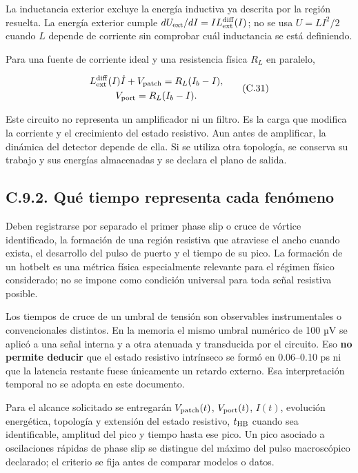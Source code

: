 \documentclass[
  spanish,
  10pt,
  a4paper,
]{article}
\begin{document}
La inductancia exterior excluye la energía inductiva ya descrita por la
región resuelta. La energía exterior cumple
\(dU_{\rm ext}/dI=I L_{\rm ext}^{\rm diff}(I)\); no se usa \(U=LI^2/2\)
cuando \(L\) depende de corriente sin comprobar cuál inductancia se está
definiendo.

Para una fuente de corriente ideal y una resistencia física \(R_L\) en
paralelo,

\[
\begin{gathered}
L_{\rm ext}^{\rm diff}(I)\dot I+V_{\rm patch}
=R_L(I_b-I),\\
V_{\rm port}=R_L(I_b-I).
\end{gathered} \tag{C.31}
\]

Este circuito no representa un amplificador ni un filtro. Es la carga
que modifica la corriente y el crecimiento del estado resistivo. Aun
antes de amplificar, la dinámica del detector depende de ella. Si se
utiliza otra topología, se conserva su trabajo y sus energías
almacenadas y se declara el plano de salida.

\subsection{C.9.2. Qué tiempo representa cada
fenómeno}\label{c.9.2.-quuxe9-tiempo-representa-cada-fenuxf3meno}

Deben registrarse por separado el primer phase slip o cruce de vórtice
identificado, la formación de una región resistiva que atraviese el
ancho cuando exista, el desarrollo del pulso de puerto y el tiempo de su
pico. La formación de un hotbelt es una métrica física especialmente
relevante para el régimen físico considerado; no se impone como
condición universal para toda señal resistiva posible.

Los tiempos de cruce de un umbral de tensión son observables
instrumentales o convencionales distintos. En la memoria el mismo umbral
numérico de 100 µV se aplicó a una señal interna y a otra atenuada y
transducida por el circuito. Eso \textbf{no permite deducir} que el
estado resistivo intrínseco se formó en 0.06--0.10 ps ni que la latencia
restante fuese únicamente un retardo externo. Esa interpretación
temporal no se adopta en este documento.

Para el alcance solicitado se entregarán \(V_{\rm patch}(t)\),
\(V_{\rm port}(t)\), \(I(t)\), evolución energética, topología y
extensión del estado resistivo, \(t_{\rm HB}\) cuando sea identificable,
amplitud del pico y tiempo hasta ese pico. Un pico asociado a
oscilaciones rápidas de phase slip se distingue del máximo del pulso
macroscópico declarado; el criterio se fija antes de comparar modelos o
datos.
\end{document}
